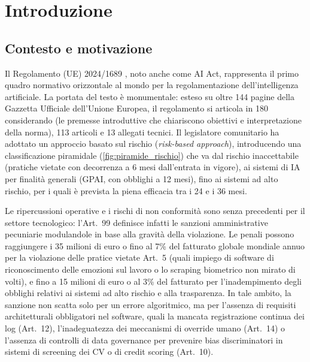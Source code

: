 \documentclass[12pt,a4paper,oneside]{report}
\begin{document}
\tableofcontents
\clearpage

\listoffigures
\clearpage

\listoftables
\clearpage


\chapter{Introduzione}

\section{Contesto e motivazione}
\label{sec:contesto}

Il Regolamento (UE) 2024/1689 \cite{aiact2024}, noto anche come AI Act, rappresenta il primo quadro normativo orizzontale al mondo per la regolamentazione dell'intelligenza artificiale. La portata del testo è monumentale: esteso su oltre 144 pagine della Gazzetta Ufficiale dell'Unione Europea, il regolamento si articola in 180 considerando (le premesse introduttive che chiariscono obiettivi e interpretazione della norma), 113 articoli e 13 allegati tecnici. Il legislatore comunitario ha adottato un approccio basato sul rischio (\textit{risk-based approach}), introducendo una classificazione piramidale (\cref{fig:piramide_rischio}) che va dal rischio inaccettabile (pratiche vietate con decorrenza a 6 mesi dall'entrata in vigore), ai sistemi di IA per finalità generali (GPAI, con obblighi a 12 mesi), fino ai sistemi ad alto rischio, per i quali è prevista la piena efficacia tra i 24 e i 36 mesi.

Le ripercussioni operative e i rischi di non conformità sono senza precedenti per il settore tecnologico:
l'Art.~99 definisce infatti le sanzioni amministrative pecuniarie modulandole in base alla gravità della violazione. Le penali possono raggiungere i 35 milioni di euro o fino al 7\% del fatturato globale mondiale annuo per la violazione delle pratice vietate Art.~5 (quali impiego di software di riconoscimento delle emozioni sul lavoro o lo scraping biometrico non mirato di volti), e fino a 15 milioni di euro o al 3\% del fatturato per l'inadempimento degli obblighi relativi ai sistemi ad alto rischio e alla trasparenza. In tale ambito, la sanzione non scatta solo per un errore algoritmico, ma per l'assenza di requisiti architetturali obbligatori nel software, quali la mancata registrazione continua dei log (Art.~12), l'inadeguatezza dei meccanismi di override umano (Art.~14) o l'assenza di controlli di data governance per prevenire bias discriminatori in sistemi di screening dei CV o di credit scoring (Art.~10).
\end{document}
